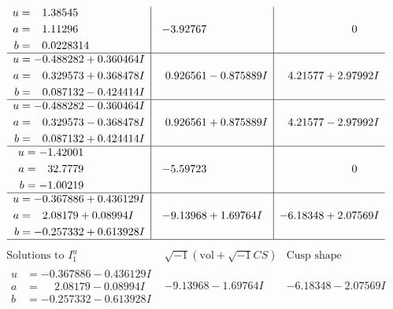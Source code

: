 \documentclass[1p]{elsarticle_modified}
\theoremstyle{definition}
\newcommand{\I}{\sqrt{-1}}
\begin{document}
$$\begin{array}{c|c|c}
\begin{aligned}
u &= \phantom{-}1.38545\phantom{ +0.000000I} \\
a &= \phantom{-}1.11296\phantom{ +0.000000I} \\
b &= \phantom{-}0.0228314\phantom{ +0.000000I}\end{aligned}
 & -3.92767\phantom{ +0.000000I} & \phantom{-0.000000 } 0 \\ \hline\begin{aligned}
u &= -0.488282 + 0.360464 I \\
a &= \phantom{-}0.329573 + 0.368478 I \\
b &= \phantom{-}0.087132 - 0.424414 I\end{aligned}
 & \phantom{-}0.926561 - 0.875889 I & \phantom{-}4.21577 + 2.97992 I \\ \hline\begin{aligned}
u &= -0.488282 - 0.360464 I \\
a &= \phantom{-}0.329573 - 0.368478 I \\
b &= \phantom{-}0.087132 + 0.424414 I\end{aligned}
 & \phantom{-}0.926561 + 0.875889 I & \phantom{-}4.21577 - 2.97992 I \\ \hline\begin{aligned}
u &= -1.42001\phantom{ +0.000000I} \\
a &= \phantom{-}32.7779\phantom{ +0.000000I} \\
b &= -1.00219\phantom{ +0.000000I}\end{aligned}
 & -5.59723\phantom{ +0.000000I} & \phantom{-0.000000 } 0 \\ \hline\begin{aligned}
u &= -0.367886 + 0.436129 I \\
a &= \phantom{-}2.08179 + 0.08994 I \\
b &= -0.257332 + 0.613928 I\end{aligned}
 & -9.13968 + 1.69764 I & -6.18348 + 2.07569 I\\
 \hline 
 \end{array}$$\newpage$$\begin{array}{c|c|c}  
\text{Solutions to }I^u_{1}& \I (\text{vol} + \sqrt{-1}CS) & \text{Cusp shape}\\
 \hline 
\begin{aligned}
u &= -0.367886 - 0.436129 I \\
a &= \phantom{-}2.08179 - 0.08994 I \\
b &= -0.257332 - 0.613928 I\end{aligned}
 & -9.13968 - 1.69764 I & -6.18348 - 2.07569 I \\ \hline\begin{aligned}

\end{aligned}
\end{array}$$
\end{document}
